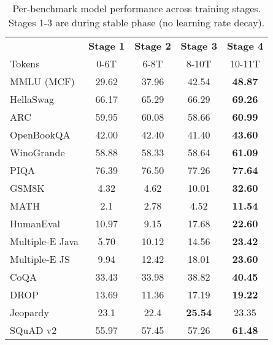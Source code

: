 \begin{table}[!h]
\caption{Per-benchmark model performance across training stages. Stages 1-3 are during stable phase (no learning rate decay).}
\label{tab:training_stages_evals}
\centering
\begin{tabular}{lcccc}
\toprule
& \textbf{Stage 1} & \textbf{Stage 2} & \textbf{Stage 3} & \textbf{Stage 4} \\
Tokens & 0-6T & 6-8T & 8-10T & 10-11T \\
\midrule
MMLU (MCF) & 29.62 & 37.96 & 42.54 & \textbf{48.87} \\
HellaSwag & 66.17 & 65.29 & 66.29 & \textbf{69.26} \\
ARC & 59.95 & 60.08 & 58.66 & \textbf{60.99} \\
OpenBookQA & 42.00 & 42.40 & 41.40 & \textbf{43.60} \\
WinoGrande & 58.88 & 58.33 & 58.64 & \textbf{61.09} \\
PIQA & 76.39 & 76.50 & 77.26 & \textbf{77.64} \\
\midrule
GSM8K & 4.32 & 4.62 & 10.01 & \textbf{32.60} \\  %
MATH & 2.1 & 2.78 & 4.52 & \textbf{11.54} \\

\midrule
HumanEval & 10.97 & 9.15 & 17.68 & \textbf{22.60} \\
Multiple-E Java & 5.70 & 10.12 & 14.56 & \textbf{23.42} \\
Multiple-E JS & 9.94 & 12.42 & 18.01 & \textbf{23.60} \\
\midrule
CoQA & 33.43 & 33.98 & 38.82 & \textbf{40.45} \\
DROP & 13.69 & 11.36 & 17.19 & \textbf{19.22} \\
Jeopardy & 23.1 & 22.4 & \textbf{25.54 }& 23.35 \\
SQuAD v2 & 55.97 & 57.45 & 57.26 & \textbf{61.48} \\
\bottomrule
\end{tabular}
\end{table}